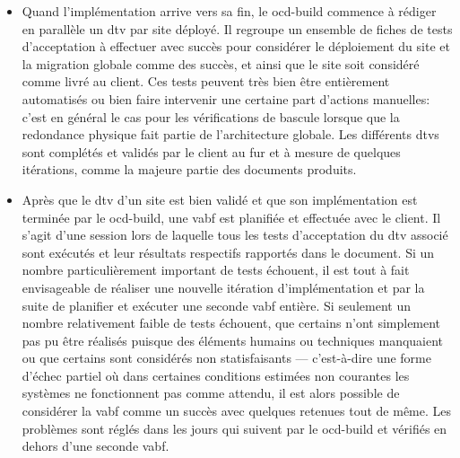 \documentclass[12pt, oneside, a4paper, titlepage]{report}
\begin{document}
\begin{itemize}
    \item Quand l'implémentation arrive vers sa fin, le \gls{ocd-build} commence
        à rédiger en parallèle un \gls{dtv} par site déployé. Il regroupe un
        ensemble de fiches de tests d'acceptation à effectuer avec succès pour
        considérer le déploiement du site et la migration globale comme des
        succès, et ainsi que le site soit considéré comme livré au client. Ces
        tests peuvent très bien être entièrement automatisés ou bien faire
        intervenir une certaine part d'actions manuelles: c'est en général le
        cas pour les vérifications de bascule lorsque que la redondance physique
        fait partie de l'architecture globale.  Les différents \glspl{dtv} sont
        complétés et validés par le client au fur et à mesure de quelques
        itérations, comme la majeure partie des documents produits.

    \item Après que le \gls{dtv} d'un site est bien validé et que son
        implémentation est terminée par le \gls{ocd-build}, une \gls{vabf} est
        planifiée et effectuée avec le client. Il s'agit d'une session lors de
        laquelle tous les tests d'acceptation du \gls{dtv} associé sont exécutés
        et leur résultats respectifs rapportés dans le document. Si un nombre
        particulièrement important de tests échouent, il est tout à fait
        envisageable de réaliser une nouvelle itération d'implémentation et par
        la suite de planifier et exécuter une seconde \gls{vabf} entière. Si
        seulement un nombre relativement faible de tests échouent, que certains
        n'ont simplement pas pu être réalisés puisque des éléments humains ou
        techniques manquaient ou que certains sont considérés non statisfaisants
        --- c'est-à-dire une forme d'échec partiel où dans certaines conditions
        estimées non courantes les systèmes ne fonctionnent pas comme attendu,
        il est alors possible de considérer la \gls{vabf} comme un succès avec
        quelques retenues tout de même. Les problèmes sont réglés dans les jours
        qui suivent par le \gls{ocd-build} et vérifiés en dehors d'une seconde
        \gls{vabf}.


\end{itemize}
\end{document}

